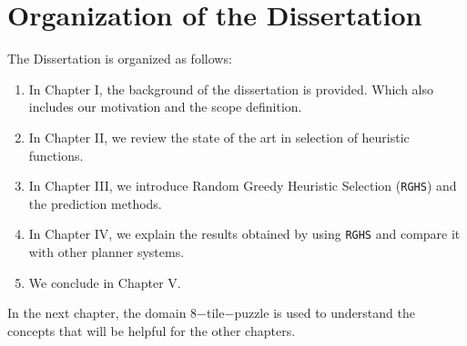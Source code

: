 \section{Organization of the Dissertation}
\noindent
The Dissertation is organized as follows: 
\begin{enumerate}
\item In Chapter I, the background of the dissertation is provided. Which also includes our motivation and the scope definition.
\item In Chapter II, we review the state of the art in selection of heuristic functions.
\item In Chapter III, we introduce Random Greedy Heuristic Selection (\texttt{RGHS}) and the prediction methods. 
\item In Chapter IV, we explain the results obtained by using \texttt{RGHS} and compare it with other planner systems.
\item We conclude in Chapter V.
\end{enumerate}

In the next chapter, the domain 8$-$tile$-$puzzle is used to understand the concepts that will be helpful for the other chapters. \\

\clearpage